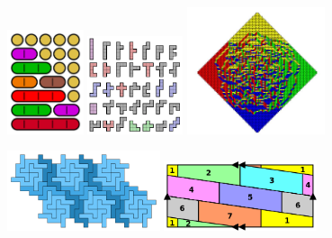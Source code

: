 \documentclass{deliverablereport}
\begin{document}
\begin{figure}[h]\begin{center}
    \includegraphics[width=0.20\textwidth]{images/partitions-of-5}
    \hspace{24px}
  \includegraphics[width=0.25\textwidth]{images/hexominoes}
    \hspace{4px}
  \includegraphics[width=0.36\textwidth]{images/AztecDiamond}
\end{center}\end{figure}\begin{figure}[h]\begin{center}
    \includegraphics[width=0.4\textwidth]{images/nonominoes}
    \hspace{32px}
  \includegraphics[width=0.4\textwidth]{images/500px-Torus_with_seven_colours}

\end{center}
\end{figure}
\end{document}
